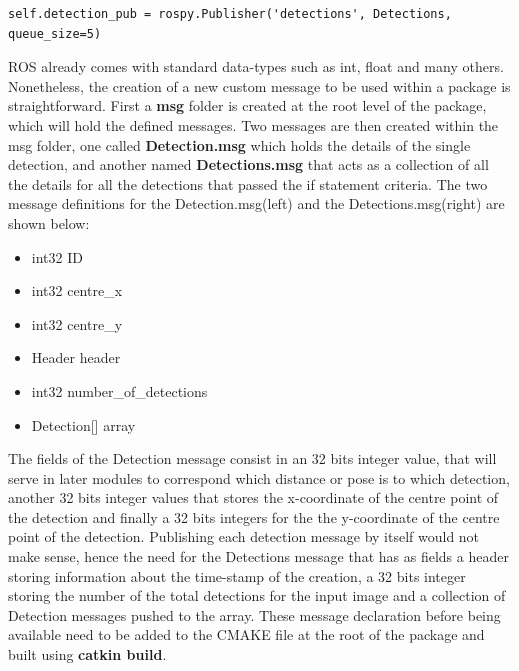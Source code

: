 \begin{lstlisting}
self.detection_pub = rospy.Publisher('detections', Detections, queue_size=5)
\end{lstlisting}

ROS already comes with standard data-types such as int, float and many others. Nonetheless, the creation of a new custom message to be used within a package is straightforward. First a \textbf{msg} folder is created at the root level of the package, which will hold the defined messages. Two messages are then created within the msg folder, one called \textbf{Detection.msg} which holds the details of the single detection, and another named \textbf{Detections.msg} that acts as a collection of all the details for all the detections that passed the if statement criteria. The two message definitions for the Detection.msg(left) and the Detections.msg(right) are shown below:

\begin{multicols}{2}
  \begin{itemize}
    \item int32 ID
    \item int32 centre\_x
    \item int32 centre\_y
  \end{itemize}

  \columnbreak

  \begin{itemize}
    \item Header header
    \item int32 number\_of\_detections
    \item Detection[] array
  \end{itemize}
\end{multicols}

The fields of the Detection message consist in an 32 bits integer value, that will serve in later modules to correspond which distance or pose is to which detection, another 32 bits integer values that stores the x-coordinate of the centre point of the detection and finally a 32 bits integers for the the y-coordinate of the centre point of the detection. Publishing each detection message by itself would not make sense, hence the need for the Detections message that has as fields a header storing information about the time-stamp of the creation, a 32 bits integer storing the number of the total detections for the input image and a collection of Detection messages pushed to the array. These message declaration before being available need to be added to the CMAKE file at the root of the package and built using \textbf{catkin build}.


